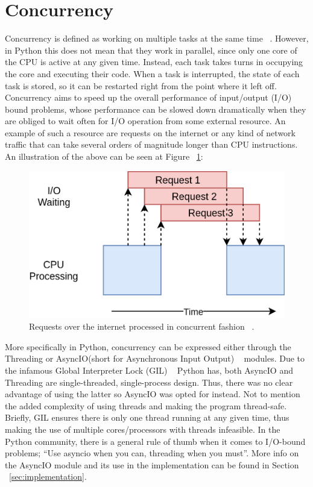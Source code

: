 \section{Concurrency}
Concurrency is defined as working on multiple tasks at the same time ~\cite{concurrency_realpython}. However, in Python this does not mean that they work in parallel, since only one core of the CPU is active at any given time. Instead, each task takes turns in occupying the core and executing their code. When a task is interrupted, the state of each task is stored, so it can be restarted right from the point where it left off. Concurrency aims to speed up the overall performance of input/output (I/O) bound problems, whose performance can be slowed down dramatically when they are obliged to wait often for I/O operation from some external resource. An example of such a resource are requests on the internet or any kind of network traffic that can take several orders of magnitude longer than CPU instructions. An illustration of the above can be seen at Figure ~\ref{fig:concurrency_example}:

\begin{figure}[ht]
 \centering
 \includegraphics[width=5in]{figures/concurrency_example.png}
 \caption{Requests over the internet processed in concurrent fashion ~\cite{concurrency_realpython}.}
 \label{fig:concurrency_example}
\end{figure}

More specifically in Python, concurrency can be expressed either through the Threading or AsyncIO(short for Asynchronous Input Output) ~\cite{asyncio} modules. Due to the infamous Global Interpreter Lock (GIL) ~\cite{gil_realpython} Python has, both AsyncIO and Threading are single-threaded, single-process design. Thus, there was no clear advantage of using the latter so AsyncIO was opted for instead. Not to mention the added complexity of using threads and making the program thread-safe. Briefly, GIL ensures there is only one thread running at any given time, thus making the use of multiple cores/processors with threads infeasible. 
In the Python community, there is a general rule of thumb when it comes to I/O-bound problems; “Use asyncio when you can, threading when you must”.
More info on the AsyncIO module and its use in the \pname implementation can be found in Section ~\ref{sec:implementation}.

